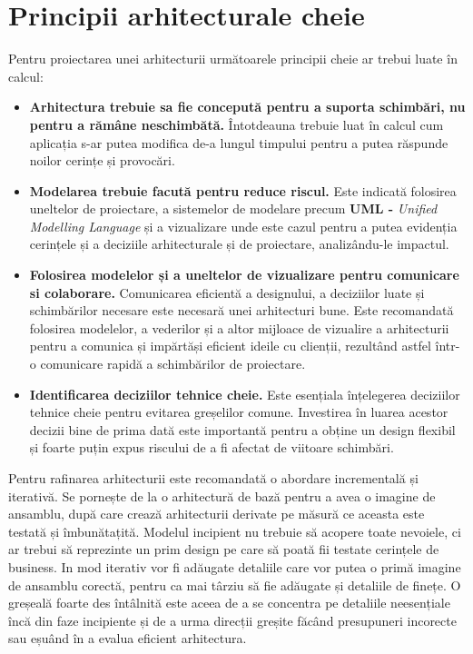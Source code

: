 \documentclass[12pt, a4paper, oneside, romanian]{teza-upb}
\begin{document}
\newpage
\section{Principii arhitecturale cheie}
Pentru proiectarea unei arhitecturii următoarele principii cheie ar trebui luate în calcul:
\begin{itemize}
	\item \textbf{Arhitectura trebuie sa fie concepută pentru a suporta schimbări, nu pentru a rămâne neschimbătă.} Întotdeauna trebuie luat în calcul cum aplicația s-ar putea modifica de-a lungul timpului pentru a putea răspunde noilor cerințe și provocări.
	\item \textbf{Modelarea trebuie facută pentru reduce riscul.} Este indicată folosirea uneltelor de proiectare, a sistemelor de modelare precum \textbf{UML -} \emph{Unified Modelling Language} și a vizualizare unde este cazul pentru a putea evidenția cerințele și a deciziile arhitecturale și de proiectare, analizându-le impactul.
	\item \textbf{Folosirea modelelor și a uneltelor de vizualizare pentru comunicare si colaborare.} Comunicarea eficientă a designului, a deciziilor luate și schimbărilor necesare este necesară unei arhitecturi bune. Este recomandată folosirea modelelor, a vederilor și a altor mijloace de vizualire a arhitecturii pentru a comunica și impărtăși eficient ideile cu clienții, rezultând astfel într-o comunicare rapidă a schimbărilor de proiectare.
	\item \textbf{Identificarea deciziilor tehnice cheie.} Este esențiala înțelegerea deciziilor tehnice cheie pentru evitarea greșelilor comune. Investirea în luarea acestor decizii bine de prima dată este importantă pentru a obține un design flexibil și foarte puțin expus riscului de a fi afectat de viitoare schimbări.
\end{itemize}

Pentru rafinarea arhitecturii este recomandată o abordare incrementală și iterativă. Se pornește de la o arhitectură de bază pentru a avea o imagine de ansamblu, după care crează arhitecturii derivate pe măsură ce aceasta este testată și îmbunătațită. Modelul incipient nu trebuie să acopere toate nevoiele, ci ar trebui să reprezinte un prim design pe care să poată fii testate cerințele de business. In mod iterativ vor fi adăugate detaliile care vor putea o primă imagine de ansamblu corectă, pentru ca mai târziu să fie adăugate și detaliile de finețe. O greșeală foarte des întâlnită este aceea de a se concentra pe detaliile neesențiale încă din faze incipiente și de a urma direcții greșite făcând presupuneri incorecte sau eșuând în a evalua eficient arhitectura. 
\end{document}
